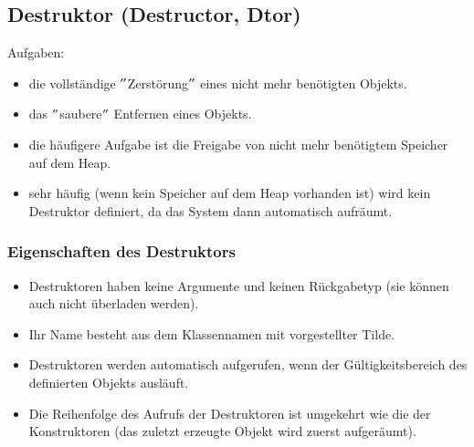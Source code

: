 \subsection{Destruktor (Destructor, Dtor)}
\begin{multicols}{2}
Aufgaben:
\begin{itemize}
	\item die vollständige $"$Zerstörung$"$ eines nicht mehr benötigten Objekts.
	\item das $"$saubere$"$ Entfernen eines Objekts.
	\item die häufigere Aufgabe ist die Freigabe von nicht mehr benötigtem Speicher auf dem Heap.
	\item sehr häufig (wenn kein Speicher auf dem Heap vorhanden ist) wird kein Destruktor definiert, da das System dann automatisch aufräumt.
\end{itemize}
\vfill\null
\columnbreak
\subsubsection{Eigenschaften des Destruktors}
\begin{itemize}
	\item Destruktoren haben keine Argumente und keinen Rückgabetyp  (sie können auch nicht überladen werden).
	\item Ihr Name besteht aus dem Klassennamen mit vorgestellter Tilde.\\
	\item Destruktoren werden automatisch aufgerufen, wenn der Gültigkeitsbereich des definierten Objekts ausläuft.
	\item Die Reihenfolge des Aufrufs der Destruktoren ist umgekehrt wie die der Konstruktoren (das zuletzt erzeugte Objekt wird zuerst aufgeräumt).
\end{itemize}
\end{multicols}


